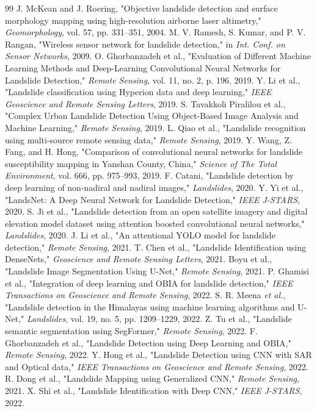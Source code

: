 \documentclass[11pt,a4paper]{article}
\begin{document}
\begin{thebibliography}{99}
 J. McKean and J. Roering, "Objective landslide detection and surface morphology mapping using high-resolution airborne laser altimetry," \textit{Geomorphology}, vol. 57, pp. 331--351, 2004.
 M. V. Ramesh, S. Kumar, and P. V. Rangan, "Wireless sensor network for landslide detection," in \textit{Int. Conf. on Sensor Networks}, 2009.
 O. Ghorbanzadeh et al., "Evaluation of Different Machine Learning Methods and Deep-Learning Convolutional Neural Networks for Landslide Detection," \textit{Remote Sensing}, vol. 11, no. 2, p. 196, 2019.
 Y. Li et al., "Landslide classification using Hyperion data and deep learning," \textit{IEEE Geoscience and Remote Sensing Letters}, 2019.
 S. Tavakkoli Piralilou et al., "Complex Urban Landslide Detection Using Object-Based Image Analysis and Machine Learning," \textit{Remote Sensing}, 2019.
 L. Qiao et al., "Landslide recognition using multi-source remote sensing data," \textit{Remote Sensing}, 2019.
 Y. Wang, Z. Fang, and H. Hong, "Comparison of convolutional neural networks for landslide susceptibility mapping in Yanshan County, China," \textit{Science of The Total Environment}, vol. 666, pp. 975--993, 2019.
 F. Catani, "Landslide detection by deep learning of non-nadiral and nadiral images," \textit{Landslides}, 2020.
 Y. Yi et al., "LandsNet: A Deep Neural Network for Landslide Detection," \textit{IEEE J-STARS}, 2020.
 S. Ji et al., "Landslide detection from an open satellite imagery and digital elevation model dataset using attention boosted convolutional neural networks," \textit{Landslides}, 2020.
 J. Li et al., "An attentional YOLO model for landslide detection," \textit{Remote Sensing}, 2021.
 T. Chen et al., "Landslide Identification using DenseNets," \textit{Geoscience and Remote Sensing Letters}, 2021.
 Boyu et al., "Landslide Image Segmentation Using U-Net," \textit{Remote Sensing}, 2021.
 P. Ghamisi et al., "Integration of deep learning and OBIA for landslide detection," \textit{IEEE Transactions on Geoscience and Remote Sensing}, 2022.
 S. R. Meena \textit{et al.}, "Landslide detection in the Himalayas using machine learning algorithms and U-Net," \textit{Landslides}, vol. 19, no. 5, pp. 1209--1229, 2022.
 Z. Tu et al., "Landslide semantic segmentation using SegFormer," \textit{Remote Sensing}, 2022.
 F. Ghorbanzadeh et al., "Landslide Detection using Deep Learning and OBIA," \textit{Remote Sensing}, 2022.
 Y. Hong et al., "Landslide Detection using CNN with SAR and Optical data," \textit{IEEE Transactions on Geoscience and Remote Sensing}, 2022.
 R. Dong et al., "Landslide Mapping using Generalized CNN," \textit{Remote Sensing}, 2021.
 X. Shi et al., "Landslide Identification with Deep CNN," \textit{IEEE J-STARS}, 2022.
\end{thebibliography}
\end{document}
